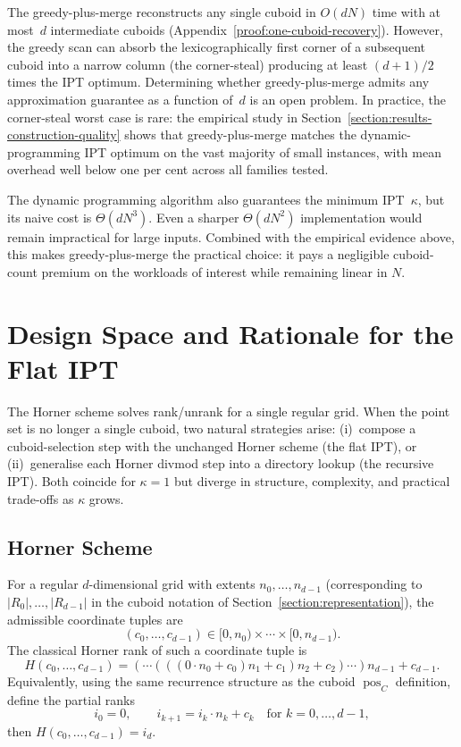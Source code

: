 \documentclass[manuscript,screen,review]{acmart}
\theoremstyle{definition}
\theoremstyle{plain}
\begin{document}
The greedy-plus-merge reconstructs any single cuboid in $O(dN)$ time
with at most~$d$ intermediate cuboids
(Appendix~\ref{proof:one-cuboid-recovery}).  However, the greedy scan
can absorb the lexicographically first corner of a subsequent cuboid
into a narrow column (the corner-steal) producing at least $(d{+}1)/2$
times the IPT optimum. Determining whether greedy-plus-merge admits any
approximation guarantee as a function of~$d$ is an open problem. In
practice, the corner-steal worst case is rare: the empirical study in
Section~\ref{section:results-construction-quality} shows that
greedy-plus-merge matches the dynamic-programming IPT optimum on the vast
majority of small instances, with mean overhead well below one per
cent across all families tested.

The dynamic programming algorithm also guarantees the minimum IPT~$\kappa$, but its naive cost is $\Theta(dN^3)$. Even a sharper $\Theta(dN^2)$ implementation would remain impractical for large inputs. Combined with the empirical evidence above, this makes greedy-plus-merge the practical choice: it pays a negligible cuboid-count premium on the workloads of interest while remaining linear in $N$.

\section{Design Space and Rationale for the Flat IPT}
\label{section:design-space}

The Horner scheme solves rank/unrank for a single regular grid.
When the point set is no longer a single cuboid, two natural strategies arise:
(i)~compose a cuboid-selection step with the unchanged Horner scheme
(the flat IPT), or
(ii)~generalise each Horner divmod step into a directory
lookup (the recursive IPT).
Both coincide for $\kappa=1$ but diverge
in structure, complexity, and practical trade-offs as
$\kappa$ grows.

\subsection{Horner Scheme}

For a regular $d$-dimensional grid with extents $n_0,\dots,n_{d-1}$ (corresponding to $|R_0|,\ldots,|R_{d-1}|$ in the cuboid notation of Section~\ref{section:representation}), the admissible coordinate tuples are
\[
  (c_0,\dots,c_{d-1}) \in [0,n_0) \times \cdots \times [0,n_{d-1}).
\]
The classical Horner rank of such a coordinate tuple is
\[
  H(c_0,\dots,c_{d-1})
  = (\cdots (((0 \cdot n_0 + c_0) n_1 + c_1)n_2 + c_2) \cdots ) n_{d-1} + c_{d-1}.
\]
Equivalently, using the same recurrence structure as the cuboid $\operatorname{pos}_C$ definition, define the partial ranks
\[
  i_0 = 0,
  \qquad
  i_{k+1} = i_k \cdot n_k + c_k
  \quad\text{for } k = 0,\ldots,d{-}1,
\]
then $H(c_0,\dots,c_{d-1}) = i_d$.
\end{document}
